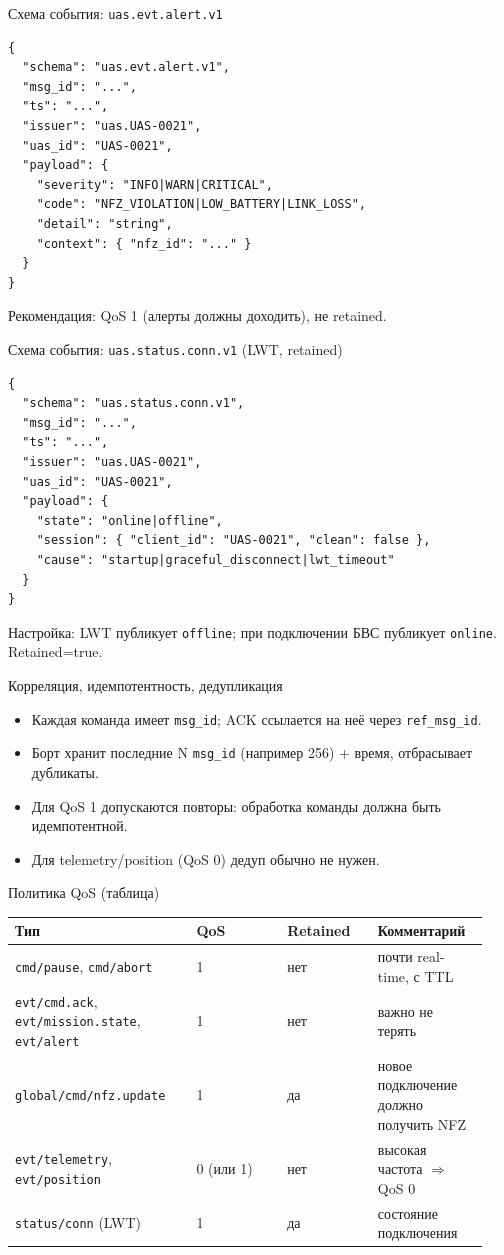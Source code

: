 \documentclass[aspectratio=169]{beamer}
\begin{document}
\begin{frame}{Схема события: \texttt{uas.evt.alert.v1}}
\small
\begin{verbatim}
{
  "schema": "uas.evt.alert.v1",
  "msg_id": "...",
  "ts": "...",
  "issuer": "uas.UAS-0021",
  "uas_id": "UAS-0021",
  "payload": {
    "severity": "INFO|WARN|CRITICAL",
    "code": "NFZ_VIOLATION|LOW_BATTERY|LINK_LOSS",
    "detail": "string",
    "context": { "nfz_id": "..." }
  }
}
\end{verbatim}
Рекомендация: QoS 1 (алерты должны доходить), не retained.
\end{frame}

\begin{frame}{Схема события: \texttt{uas.status.conn.v1} (LWT, retained)}
\small
\begin{verbatim}
{
  "schema": "uas.status.conn.v1",
  "msg_id": "...",
  "ts": "...",
  "issuer": "uas.UAS-0021",
  "uas_id": "UAS-0021",
  "payload": {
    "state": "online|offline",
    "session": { "client_id": "UAS-0021", "clean": false },
    "cause": "startup|graceful_disconnect|lwt_timeout"
  }
}
\end{verbatim}
Настройка: LWT публикует \texttt{offline}; при подключении БВС публикует \texttt{online}. Retained=true.
\end{frame}

\begin{frame}{Корреляция, идемпотентность, дедупликация}
\begin{itemize}
  \item Каждая команда имеет \texttt{msg\_id}; ACK ссылается на неё через \texttt{ref\_msg\_id}.
  \item Борт хранит последние N \texttt{msg\_id} (например 256) + время, отбрасывает дубликаты.
  \item Для QoS 1 допускаются повторы: обработка команды должна быть идемпотентной.
  \item Для telemetry/position (QoS 0) дедуп обычно не нужен.
\end{itemize}
\end{frame}

\begin{frame}{Политика QoS (таблица)}
\small
\begin{tabular}{@{}p{0.36\linewidth}p{0.18\linewidth}p{0.18\linewidth}p{0.22\linewidth}@{}}
\toprule
Тип & QoS & Retained & Комментарий \\
\midrule
\texttt{cmd/pause}, \texttt{cmd/abort} & 1 & нет & почти real-time, с TTL \\
\texttt{evt/cmd.ack}, \texttt{evt/mission.state}, \texttt{evt/alert} & 1 & нет & важно не терять \\
\texttt{global/cmd/nfz.update} & 1 & да & новое подключение должно получить NFZ \\
\texttt{evt/telemetry}, \texttt{evt/position} & 0 (или 1) & нет & высокая частота $\Rightarrow$ QoS 0 \\
\texttt{status/conn} (LWT) & 1 & да & состояние подключения \\
\bottomrule
\end{tabular}
\end{frame}
\end{document}
